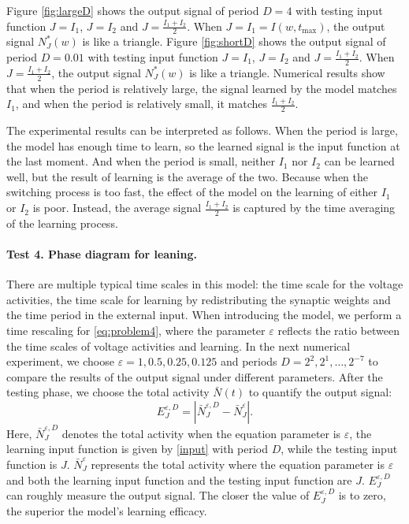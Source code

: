 Figure \ref{fig:largeD} shows the output signal of period $D=4$ with testing input function $J=I_1$, $J=I_2$ and $J=\frac{I_1+I_2}{2}$. When $J=I_1=I(w,t_\text{max})$, the output signal $N_J^*(w)$ is like a triangle. Figure \ref{fig:shortD} shows the output signal of period $D=0.01$ with testing input function $J=I_1$, $J=I_2$ and $J=\frac{I_1+I_2}{2}$. When $J=\frac{I_1+I_2}{2}$, the output signal $N_J^*(w)$ is like a triangle. Numerical results show that when the period is relatively large, the signal learned by the model matches $I_1$, and when the period is relatively small, it matches $\frac{I_1+I_2}{2}$. 

The experimental results can be interpreted as follows. When the period is large, the model has enough time to learn, so the learned signal is the input function at the last moment. And when the period is small, neither $I_1$ nor $I_2$ can be learned well, but the result of learning is the average of the two.  Because when the switching process is too fast, the effect of the model on the learning of either $I_1$ or $I_2$ is poor. Instead, the average signal $\frac{I_1+I_2}{2}$ is captured by the time averaging of the learning process. 


 \paragraph{Test 4. Phase diagram for leaning.} There are multiple typical time scales in this model: the time scale for the voltage activities, the time scale for learning by redistributing the synaptic weights and the time period in the external input. When introducing the model, we perform a time rescaling for \eqref{eq:problem4}, where the parameter $\varepsilon$ reflects the ratio between the time scales of voltage activities and learning. In the next numerical experiment, we choose $\varepsilon=1,0.5,0.25,0.125$ and periods $D=2^2,2^1,\dots,2^{-7}$ to compare the results of the output signal under different parameters. After the testing phase, we choose the total activity $\bar{N}(t)$ to quantify the output signal:
\begin{equation}
    \label{judge_tool}
    E^{\varepsilon,D}_J=\left| \bar{N}^{\varepsilon,D}_J -\bar{N}^{\varepsilon}_J \right|.
\end{equation}
Here, $\bar{N}^{\varepsilon,D}_J$ denotes the total activity when the equation parameter is $\varepsilon$, the learning input function is given by \eqref{input} with period $D$, while the testing input function is $J$. $\bar{N}^{\varepsilon}_J$ represents the total activity where the equation parameter is $\varepsilon$ and both the learning input function and the testing input function are $J$. $E^{\varepsilon,D}_J$ can roughly measure the output signal. The closer the value of $E^{\varepsilon,D}_J$ is to zero, the superior the model's learning efficacy.

